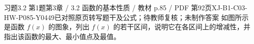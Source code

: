 \par\noindent\begin{minipage}{\linewidth}
\begin{bankitem}{习题3.2 第1题}{第3章 / 3.2 函数的基本性质 / 教材 p.85 / PDF 第92页}{XJ-B1-C03-HW-P085-Y0449}{已对照原页转写题干及公式；待教师复核；未制作答案}
如图所示是函数 $f(x)$ 的图象，列出 $f(x)$ 的若干区间，说明它在各区间上的增减性，并指出该函数的最大、最小值点及最值。
\end{bankitem}
\end{minipage}\par\medskip
